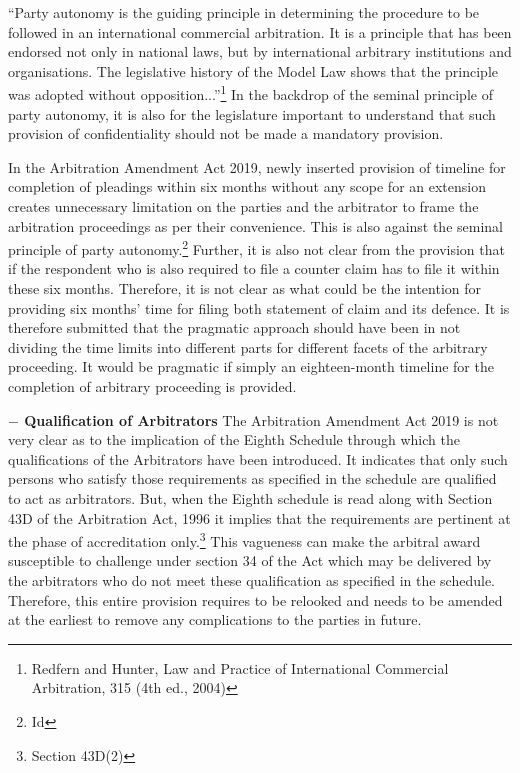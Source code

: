 \begin{multicols}{2}
\noi
“Party autonomy is the guiding principle in determining the procedure to be followed in an
international commercial arbitration. It is a principle that has been endorsed not only in
national laws, but by international arbitrary institutions and organisations. The legislative
history of the Model Law shows that the principle was adopted without opposition...”\footnote{Redfern and Hunter, Law and Practice of International Commercial Arbitration, 315 (4th ed., 2004)}
In the backdrop of the seminal principle of party autonomy, it is also for the legislature
important to understand that such provision of confidentiality should not be made a
mandatory provision.


\noi
In the Arbitration Amendment Act 2019, newly inserted provision of timeline for completion
of pleadings within six months without any scope for an extension creates unnecessary
limitation on the parties and the arbitrator to frame the arbitration proceedings as per their
convenience. This is also against the seminal principle of party autonomy.\footnote{Id} Further, it is also
not clear from the provision that if the respondent who is also required to file a counter claim
has to file it within these six months. Therefore, it is not clear as what could be the intention
for providing six months’ time for filing both statement of claim and its defence. It is
therefore submitted that the pragmatic approach should have been in not dividing the time
limits into different parts for different facets of the arbitrary proceeding. It would be
pragmatic if simply an eighteen-month timeline for the completion of arbitrary proceeding is
provided.

\noi
{\large \bfseries $-$ Qualification of Arbitrators}
The Arbitration Amendment Act 2019 is not very clear as to the implication of the Eighth
Schedule through which the qualifications of the Arbitrators have been introduced. It
indicates that only such persons who satisfy those requirements as specified in the schedule
are qualified to act as arbitrators. But, when the Eighth schedule is read along with Section
43D of the Arbitration Act, 1996 it implies that the requirements are pertinent at the phase of accreditation only.\footnote{Section 43D(2)} This vagueness can make the arbitral award susceptible to challenge
under section 34 of the Act which may be delivered by the arbitrators who do not meet these
qualification as specified in the schedule. Therefore, this entire provision requires to be relooked and needs to be amended at the earliest to remove any complications to the parties in future.


\end{multicols}
